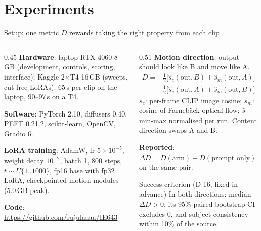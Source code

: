 \documentclass[aspectratio=169,11pt]{beamer}
\newcommand{\dD}{\Delta D}
\begin{document}
\section{Experiments}
\begin{frame}{Setup: one metric $D$ rewards taking the right property from each clip}
  \begin{columns}[T,onlytextwidth]
    \begin{column}{0.45\textwidth}
      \small
      \textbf{Hardware}: laptop RTX 4060 8\,GB (development, controls, scoring, interface);
      Kaggle 2$\times$T4 16\,GB (sweeps, cut-free LoRAs). 65\,s per clip on the laptop, 90--97\,s on a T4.

      \textbf{Software}: PyTorch 2.10, diffusers 0.40, PEFT 0.21.2, scikit-learn, OpenCV, Gradio 6.

      \textbf{LoRA training}: AdamW, lr $5\times10^{-5}$, weight decay $10^{-2}$, batch 1, 800 steps,
      $t\sim U\{1..1000\}$, fp16 base with fp32 LoRA, checkpointed motion modules (5.0\,GB peak).

      \textbf{Code}: \url{https://github.com/rujulaaaa/IE643}
    \end{column}
    \begin{column}{0.51\textwidth}
      \footnotesize
      \textbf{Motion direction}: output should look like B and move like A.
      \[
        \begin{aligned}
        D = {}&\tfrac12\big[\hat s_c(\text{out},B) + \hat s_m(\text{out},A)\big] && \text{right property}\\
          -{}&\tfrac12\big[\hat s_c(\text{out},A) + \hat s_m(\text{out},B)\big] && \text{wrong property}
        \end{aligned}
      \]
      $s_c$: per-frame CLIP image cosine; $s_m$: cosine of Farneb\"ack optical flow;
      $\hat s$ min-max normalised per run. Content direction swaps A and B.

      \textbf{Reported}: $\dD = D(\text{arm}) - D(\text{prompt only})$ on the same pair.

      \begin{block}{Success criterion (D-16, fixed in advance)}\footnotesize
        In both directions: median $\dD>0$, its 95\% paired-bootstrap CI excludes 0, and subject
        consistency within 10\% of the source.
      \end{block}
    \end{column}
  \end{columns}
\end{frame}
\end{document}
